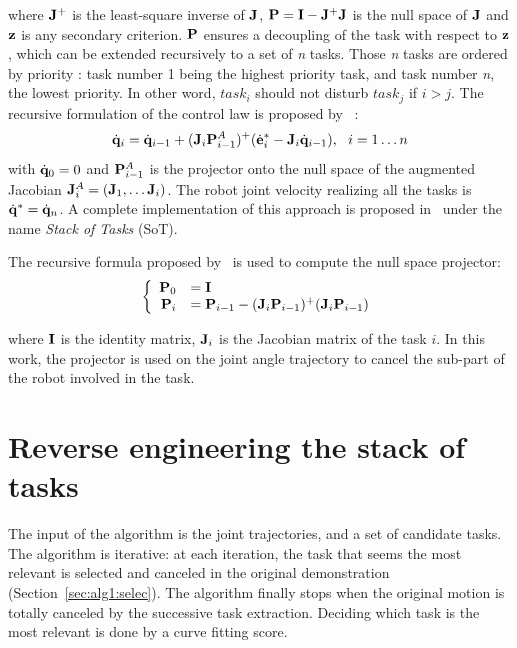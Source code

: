 \documentclass[letterpaper, 10pt, conference]{ieeeconf}      %
\begin{document}
\noindent where ${\mathbf{J}}^+$ is the least-square inverse of ${\mathbf{J}}$,
${\mathbf{P}} = {\mathbf{I}} - {\mathbf{J}}^+ {\mathbf{J}}$ is the null space
of ${\mathbf{J}}$ and ${\mathbf{z}}$ is any secondary criterion. ${\mathbf{P}}$ ensures
a decoupling of the task with respect to ${\mathbf{z}}$, which can be extended
recursively to a set of \emph{n} tasks. Those \emph{n} tasks
are ordered by priority : task number 1 being the highest priority task,
and task number \emph{n}, the lowest priority.
In other word, $task_i$ should not disturb $task_j$ if $i>j$.
The recursive formulation of the control law is proposed by~\cite{siciliano91} :
\begin{equation}
\dot{{\mathbf{q}}}_i = \dot{{\mathbf{q}}}_{i-1} + ({\mathbf{J}}_i {\mathbf{P}}_{i-1}^{A})^+
(\dot{{\mathbf{e}}}^*_i - {\mathbf{J}}_i \dot{{\mathbf{q}}}_{i-1}) , \ \ i = 1 \ldots n
\end{equation}
\noindent with $\dot{{\mathbf{q}}}_0 = 0$ and ${\mathbf{P}}_{i-1}^{A}$ is
the projector onto the null space of the augmented Jacobian
${\mathbf{J}}_i^A = ({\mathbf{J}}_1, \ldots {\mathbf{J}}_i)$. The robot
joint velocity realizing all the tasks is $\dot{{\mathbf{q}}}^* = \dot{{\mathbf{q}}}_n$.
A complete implementation of this approach is proposed in~\cite{mansard07} under the
name \emph{Stack of Tasks} (SoT). 

The recursive formula proposed by~\cite{baerlocher98} is used to compute
the null space projector:
\begin{equation}
  \left\{
      \begin{array}{rl}
        {\mathbf{P}}_0 &= {\mathbf{I}}\\
        {\mathbf{P}}_i &= {\mathbf{P}}_{i-1} - ({\mathbf{J}}_i {\mathbf{P}}_{i-1})^+({\mathbf{J}}_i {\mathbf{P}}_{i-1})\\
      \end{array}
    \right.
\end{equation}

\noindent where ${\mathbf{I}}$ is the identity matrix, ${\mathbf{J}}_i$ is the Jacobian matrix
of the task $i$. In this work, the projector is used on
the joint angle trajectory to cancel the sub-part of the robot involved in the task.

\section{Reverse engineering the stack of tasks} \label{sec:detect}

The input of the algorithm is the joint trajectories, and a set of candidate
tasks. The algorithm is iterative: at each iteration, the task that seems the
most relevant is selected and canceled in the original demonstration (Section~\ref{sec:alg1:selec}).
The algorithm finally stops when the original
motion is totally canceled by the successive task extraction. Deciding which
task is the most relevant is done by a curve fitting score. 
\end{document}

